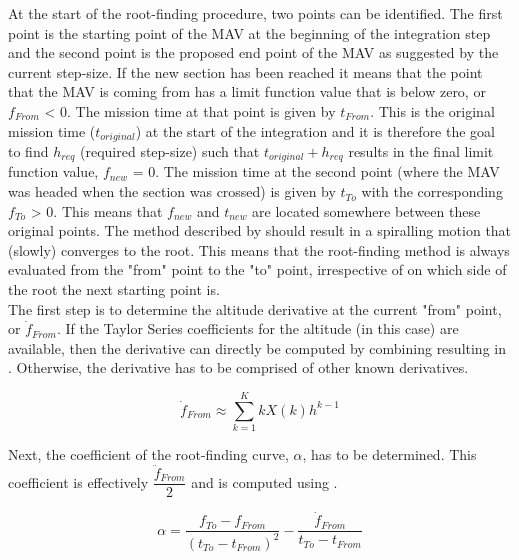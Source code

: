 \noindent
At the start of the root-finding procedure, two points can be identified. The first point is the starting point of the \ac{MAV} at the beginning of the integration step and the second point is the proposed end point of the \ac{MAV} as suggested by the current step-size. If the new section has been reached it means that the point that the \ac{MAV} is coming from has a limit function value that is below zero, or $f_{From}$ < 0. The mission time at that point is given by $t_{From}$. This is the original mission time ($t_{original}$) at the start of the integration and it is therefore the goal to find $h_{req}$ (required step-size) such that $t_{original}+h_{req}$ results in the final limit function value, $f_{new}$ = 0. The mission time at the second point (where the \ac{MAV} was headed when the section was crossed) is given by $t_{To}$ with the corresponding $f_{To}$ > 0. This means that $f_{new}$ and $t_{new}$ are located somewhere between these original points. The method described by \cite{bergsma2015application} should result in a spiralling motion that (slowly) converges to the root. This means that the root-finding method is always evaluated from the "from" point to the "to" point, irrespective of on which side of the root the next starting point is. \\

\noindent
The first step is to determine the altitude derivative at the current "from" point, or $\dot{f}_{From}$. If the Taylor Series coefficients for the altitude (in this case) are available, then the derivative can directly be computed by combining  resulting in . Otherwise, the derivative has to be comprised of other known derivatives.

\begin{equation}\label{eq:fFromDot}
\dot{f}_{From} \approx \displaystyle\sum_{k=1}^{K}kX\left(k\right) h^{k-1}
\end{equation}

\noindent
Next, the coefficient of the root-finding curve, $\alpha$, has to be determined. This coefficient is effectively $\dfrac{\ddot{f}_{From}}{2}$ and is computed using .

\begin{equation} \label{eq:alphaForRoot}
\alpha = \dfrac{f_{To}-f_{From}}{\left(t_{To}-t_{From}\right)^{2}}-\dfrac{\dot{f}_{From}}{t_{To}-t_{From}}
\end{equation}


